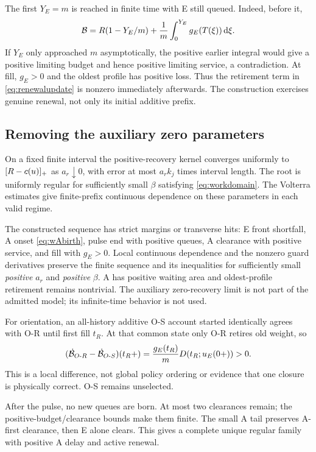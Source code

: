 The first $Y_E=m$ is reached in finite time with E still queued. Indeed,
before it,
\begin{equation}
 \mathcal B=R(1-Y_E/m)+\frac1m\int_0^{Y_E}g_E(T(\xi))\,\mathrm d\xi.
 \label{eq:wfillidentity}
\end{equation}
If $Y_E$ only approached $m$ asymptotically, the positive earlier integral
would give a positive limiting budget and hence positive limiting service,
a contradiction. At fill, $g_E>0$ and the oldest profile has positive
loss. Thus the retirement term in \eqref{eq:renewalupdate} is nonzero
immediately afterwards. The construction exercises genuine renewal, not
only its initial additive prefix.

\subsection{Removing the auxiliary zero parameters}
On a fixed finite interval the positive-recovery kernel converges uniformly
to $[R-c(u)]_+$ as $a_r\downarrow0$, with error at most $a_rk_j$
times interval length. The root is uniformly regular for sufficiently
small $\beta$ satisfying \eqref{eq:workdomain}. The Volterra estimates
give finite-prefix continuous dependence on these parameters in each
valid regime.

The constructed sequence has strict margins or transverse hits: E front
shortfall, A onset \eqref{eq:wAbirth}, pulse end with positive queues,
A clearance with positive service, and fill with $g_E>0$. Local continuous
dependence and the nonzero guard derivatives preserve the finite sequence
and its inequalities for sufficiently small \emph{positive} $a_r$ and
\emph{positive} $\beta$. A has positive waiting area and oldest-profile
retirement remains nontrivial. The auxiliary zero-recovery limit is not
part of the admitted model; its infinite-time behavior is not used.

For orientation, an all-history additive O-S account started identically
agrees with O-R until first fill $t_R$. At that common state only O-R
retires old weight, so
\begin{equation}
 (\dot{\mathcal B}_{O\text{-}R}-\dot{\mathcal B}_{O\text{-}S})(t_R+)
 =\frac{g_E(t_R)}mD(t_R;u_E(0+))>0. \label{eq:wrival}
\end{equation}
This is a local difference, not global policy ordering or evidence that
one closure is physically correct. O-S remains unselected.

After the pulse, no new queues are born. At most two clearances remain;
the positive-budget/clearance bounds make them finite. The small A tail
preserves A-first clearance, then E alone clears. This gives a complete
unique regular family with positive A delay and active renewal.

